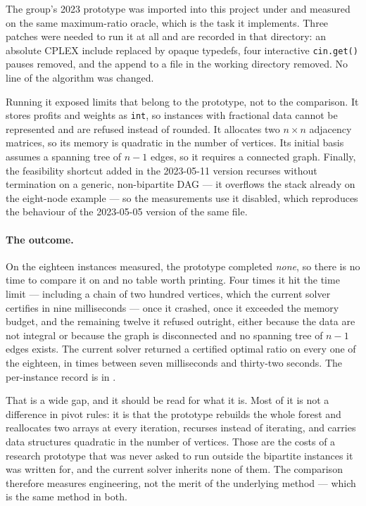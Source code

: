 The group's 2023 \FS{} prototype was imported into this project under
 and measured on the same maximum-ratio oracle, which is
the task it implements. Three patches were needed to run it at all and are
recorded in that directory: an absolute CPLEX include replaced by opaque
typedefs, four interactive \texttt{cin.get()} pauses removed, and the append to a
file in the working directory removed. No line of the algorithm was changed.

Running it exposed limits that belong to the prototype, not to the comparison.
It stores profits and weights as \texttt{int}, so instances with fractional data
cannot be represented and are refused instead of rounded. It allocates two
$n\times n$ adjacency matrices, so its memory is quadratic in the number of
vertices. Its initial basis assumes a spanning tree of $n-1$ edges, so it requires a
connected graph. Finally, the feasibility shortcut added in the 2023-05-11
version recurses without termination on a generic, non-bipartite DAG --- it
overflows the stack already on the eight-node example --- so the measurements use
it disabled, which reproduces the behaviour of the 2023-05-05 version of the same
file.

\paragraph{The outcome.} On the eighteen instances measured, the prototype
completed \emph{none}, so there is no time to compare it on and no table worth
printing. Four times it hit the time limit --- including a chain of two hundred
vertices, which the current solver certifies in nine milliseconds --- once it
crashed, once it exceeded the memory budget, and the remaining twelve it refused
outright, either because the data are not integral or because the graph is
disconnected and no spanning tree of $n-1$ edges exists. The current solver
returned a certified optimal ratio on every one of the eighteen, in times between
seven milliseconds and thirty-two seconds. The per-instance record is in
.

That is a wide gap, and it should be read for what it is. Most of it is not a
difference in pivot rules: it is that the prototype rebuilds the whole forest and
reallocates two arrays at every iteration, recurses instead of iterating, and
carries data structures quadratic in the number of vertices. Those are the costs of
a research prototype that was never asked to run outside the bipartite instances
it was written for, and the current solver inherits none of them. The comparison
therefore measures engineering, not the merit of the underlying method --- which
is the same method in both.

